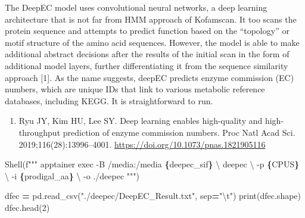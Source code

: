 \documentclass[
]{book}
\newenvironment{Shaded}{\begin{snugshade}}{\end{snugshade}}
\newcommand{\BuiltInTok}[1]{#1}
\newcommand{\CharTok}[1]{\textcolor[rgb]{0.31,0.60,0.02}{#1}}
\newcommand{\DecValTok}[1]{\textcolor[rgb]{0.00,0.00,0.81}{#1}}
\newcommand{\NormalTok}[1]{#1}
\newcommand{\OperatorTok}[1]{\textcolor[rgb]{0.81,0.36,0.00}{\textbf{#1}}}
\newcommand{\SpecialCharTok}[1]{\textcolor[rgb]{0.81,0.36,0.00}{\textbf{#1}}}
\newcommand{\SpecialStringTok}[1]{\textcolor[rgb]{0.31,0.60,0.02}{#1}}
\newcommand{\StringTok}[1]{\textcolor[rgb]{0.31,0.60,0.02}{#1}}
\providecommand{\tightlist}{%
  \setlength{\itemsep}{0pt}\setlength{\parskip}{0pt}}
\begin{document}
The DeepEC model uses convolutional neural networks, a deep learning architecture that is not far from HMM approach of Kofamscan.
It too scans the protein sequence and attempts to predict function based on the ``topology'' or motif structure of the amino acid sequences.
However, the model is able to make additional abstract decisions after the results of the initial scan in the form of additional model layers,
further differentiating it from the sequence similarity approach {[}1{]}. As the name suggests, deepEC predicts enzyme commission (EC) numbers,
which are unique IDs that link to various metabolic reference databases, including KEGG. It is straightforward to run.

\begin{enumerate}
\def\labelenumi{\arabic{enumi}.}
\tightlist
\item
  Ryu JY, Kim HU, Lee SY. Deep learning enables high-quality and high-throughput prediction of enzyme commission numbers. Proc Natl Acad Sci. 2019;116(28):13996--4001. \url{https://doi.org/10.1073/pnas.1821905116}
\end{enumerate}

\begin{Shaded}
\begin{Highlighting}[numbers=left,,]
\NormalTok{Shell(}\SpecialStringTok{f"""}
\SpecialStringTok{apptainer exec {-}B /media:/media }\SpecialCharTok{\{}\NormalTok{deepec\_sif}\SpecialCharTok{\}}\SpecialStringTok{ }\CharTok{\textbackslash{}}
\SpecialStringTok{    deepec }\CharTok{\textbackslash{}}
\SpecialStringTok{        {-}p }\SpecialCharTok{\{}\NormalTok{CPUS}\SpecialCharTok{\}}\SpecialStringTok{ }\CharTok{\textbackslash{}}
\SpecialStringTok{        {-}i }\SpecialCharTok{\{}\NormalTok{prodigal\_aa}\SpecialCharTok{\}}\SpecialStringTok{ }\CharTok{\textbackslash{}}
\SpecialStringTok{        {-}o ./deepec}
\SpecialStringTok{"""}\NormalTok{)}
\end{Highlighting}
\end{Shaded}

\begin{Shaded}
\begin{Highlighting}[numbers=left,,]
\NormalTok{dfec }\OperatorTok{=}\NormalTok{ pd.read\_csv(}\StringTok{"./deepec/DeepEC\_Result.txt"}\NormalTok{, sep}\OperatorTok{=}\StringTok{"}\CharTok{\textbackslash{}t}\StringTok{"}\NormalTok{)}
\BuiltInTok{print}\NormalTok{(dfec.shape)}
\NormalTok{dfec.head(}\DecValTok{2}\NormalTok{)}
\end{Highlighting}
\end{Shaded}
\end{document}
